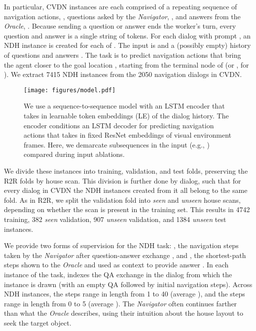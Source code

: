 \documentclass{article}
\newcommand{\dataset}{CVDN}
\newcommand{\task}{NDH}
\newcommand{\nav}{\textit{Navigator}}
\newcommand{\ora}{\textit{Oracle}}
\begin{document}
In particular, \dataset{} instances are each comprised of a repeating sequence  of navigation actions, , questions asked by the \nav{}, , and answers from the \ora{}, .
Because sending a question or answer ends the worker's turn, every question  and answer  is a single string of tokens.
For each dialog with prompt , an \task{} instance is created for each of .
The input is  and a (possibly empty) history of questions and answers .
The task is to predict navigation actions that bring the agent closer to the goal location , starting from the terminal node of  (or , for ).
We extract 7415 \task{} instances from the 2050 navigation dialogs in \dataset{}.

\begin{figure}[ht]
\centering
\texttt{[image: figures/model.pdf]}
\caption{We use a sequence-to-sequence model with an LSTM encoder that takes in learnable token embeddings (LE) of the dialog history.
The encoder conditions an LSTM decoder for predicting navigation actions that takes in fixed ResNet embeddings of visual environment frames.
Here, we demarcate subsequences in the input (e.g., ) compared during input ablations.
}
\label{fig:model}
\vspace{-3mm}
\end{figure}

We divide these instances into training, validation, and test folds, preserving the R2R folds by house scan.
This division is further done by dialog, such that for every dialog in \dataset{} the \task{} instances created from it all belong to the same fold.
As in R2R, we split the validation fold into \textit{seen} and \textit{unseen} house scans, depending on whether the scan is present in the training set. This results in 4742 training, 382 \textit{seen} validation, 907 \textit{unseen} validation, and 1384 \textit{unseen} test instances.

We provide two forms of supervision for the \task{} task: , the navigation steps taken by the \nav{} after question-answer exchange , and , the shortest-path steps shown to the \ora{} and used as context to provide answer .
In each instance of the task,  indexes the QA exchange in the dialog from which the instance is drawn (with  an empty QA followed by initial navigation steps).
Across \task{} instances, the  steps range in length from 1 to 40 (average ), and the  steps range in length from 0 to 5 (average ).
The \nav{} often continues farther than what the \ora{} describes, using their intuition about the house layout to seek the target object.
\end{document}
